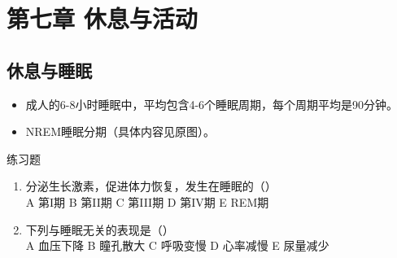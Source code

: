 \documentclass[11pt, a4paper]{ctexart}
\newcommand{\ocrimage}[1]{\texttt{#1}}
\begin{document}
\section{第七章 休息与活动}
\subsection{休息与睡眠}
\begin{itemize}
	\item 成人的6-8小时睡眠中，平均包含4-6个睡眠周期，每个周期平均是90分钟。
	\item NREM睡眠分期（具体内容见原图）。
\end{itemize}

\begin{examplebox}{练习题}
	\begin{enumerate}
		\item 分泌生长激素，促进体力恢复，发生在睡眠的（\qquad）\\
		      A 第I期 \quad B 第II期 \quad C 第III期 \quad D 第IV期 \quad E REM期
		\item 下列与睡眠无关的表现是（\qquad）\\
		      A 血压下降 \quad B 瞳孔散大 \quad C 呼吸变慢 \quad D 心率减慢 \quad E 尿量减少
	\end{enumerate}
\end{examplebox}
\end{document}
